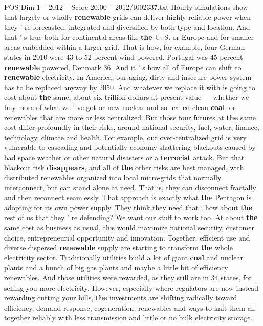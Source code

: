 \begin{textsample}{POS Dim 1 – 2012 – Score 20.00 – 2012/t002337.txt}
Hourly simulations show that largely or wholly \textbf{renewable} grids can deliver highly reliable power when they ' re forecasted, integrated and diversified by both type and location.
And that ' s true both for continental areas like \textbf{the} U.
S. or Europe and for smaller areas embedded within a larger grid.
That is how, for example, four German states in 2010 were 43 to 52 percent wind powered.
Portugal was 45 percent \textbf{renewable} powered, Denmark 36.
And it ' s how all of Europe can shift to \textbf{renewable} electricity.
In America, our aging, dirty and insecure power system has to be replaced anyway by 2050.
And whatever we replace it with is going to cost about \textbf{the} same, about six trillion dollars at present value — whether we buy more of what we ' ve got or new nuclear and so- called clean \textbf{coal}, or renewables that are more or less centralized.
But those four futures at \textbf{the} same cost differ profoundly in their risks, around national security, fuel, water, finance, technology, climate and health.
For example, our over-centralized grid is very vulnerable to cascading and potentially economy-shattering blackouts caused by bad space weather or other natural disasters or a \textbf{terrorist} attack.
But that blackout risk \textbf{disappears}, and all of \textbf{the} other risks are best managed, with distributed renewables organized into local micro-grids that normally interconnect, but can stand alone at need.
That is, they can disconnect fractally and then reconnect seamlessly.
That approach is exactly what \textbf{the} Pentagon is adopting for its own power supply.
They think they need that ; how about \textbf{the} rest of us that they ' re defending?
We want our stuff to work too.
At about \textbf{the} same cost as business as usual, this would maximize national security, customer choice, entrepreneurial opportunity and innovation.
Together, efficient use and diverse dispersed \textbf{renewable} supply are starting to transform \textbf{the} whole electricity sector.
Traditionally utilities build a lot of giant \textbf{coal} and nuclear plants and a bunch of big gas plants and maybe a little bit of efficiency renewables.
And those utilities were rewarded, as they still are in 34 states, for selling you more electricity.
However, especially where regulators are now instead rewarding cutting your bills, \textbf{the} investments are shifting radically toward efficiency, demand response, cogeneration, renewables and ways to knit them all together reliably with less transmission and little or no bulk electricity storage.

\end{textsample}
